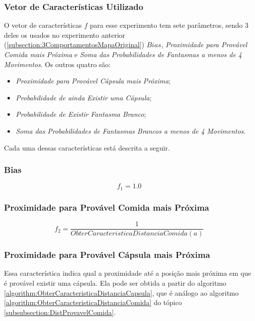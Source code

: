 \subsubsection{Vetor de Características Utilizado} \label{subsubsection:5ComportamentosVetorCaracterísticas}

O vetor de características $ f $ para esse experimento tem sete parâmetros, sendo 3 deles os usados no experimento anterior (\ref{subsection:3ComportamentosMapaOriginal}) $ Bias $, \textit{Proximidade para Provável Comida mais Próxima} e \textit{Soma das Probabilidades de Fantasmas a menos de 4 Movimentos}. Os outros quatro são:

\begin{itemize}
	\item \textit{Proximidade para Provável Cápsula mais Próxima};
	\item \textit{Probabilidade de ainda Existir uma Cápsula};
	\item \textit{Probabilidade de Existir Fantasma Branco};
	\item \textit{Soma das Probabilidades de Fantasmas Brancos a menos de 4 Movimentos}.
\end{itemize}

Cada uma dessas características está descrita a seguir.

\subsubsection*{Bias}
$$ f_1 = 1.0 $$

\subsubsection*{Proximidade para Provável Comida mais Próxima}
$$ f_2 = \frac{1}{ObterCaracteristicaDistanciaComida \left( a \right)} $$

\subsubsection*{Proximidade para Provável Cápsula mais Próxima}

Essa característica indica qual a proximidade até a posição mais próxima em que é provável existir uma cápsula. Ela pode ser obtida a partir do algoritmo \ref{algorithm:ObterCaracteristicaDistanciaCapsula}, que é análogo ao algoritmo \ref{algorithm:ObterCaracteristicaDistanciaComida} do tópico \ref{subsubsection:DistProvavelComida}.


